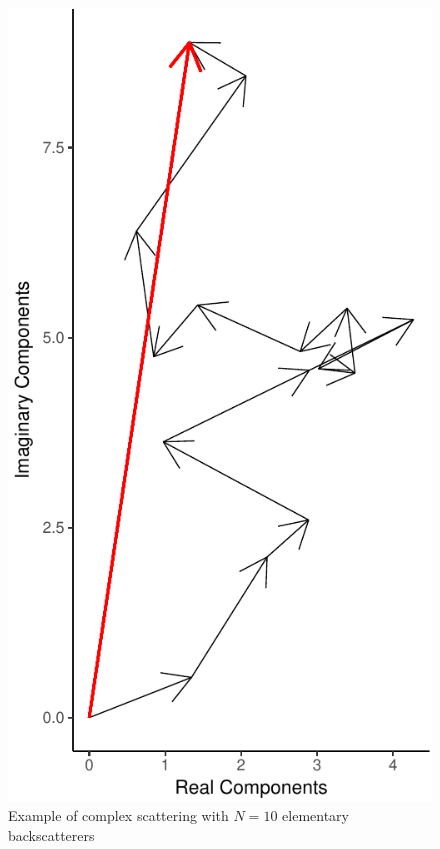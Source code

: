 \documentclass{beamer}
\begin{document}
\begin{frame}
\begin{figure}
\centering
\includegraphics[angle=-90,width=\linewidth]{Scattering}
\caption{Example of complex scattering with $N=10$ elementary backscatterers}\label{Fig:ComplexScattering}
\end{figure}
\end{frame}
\end{document}
